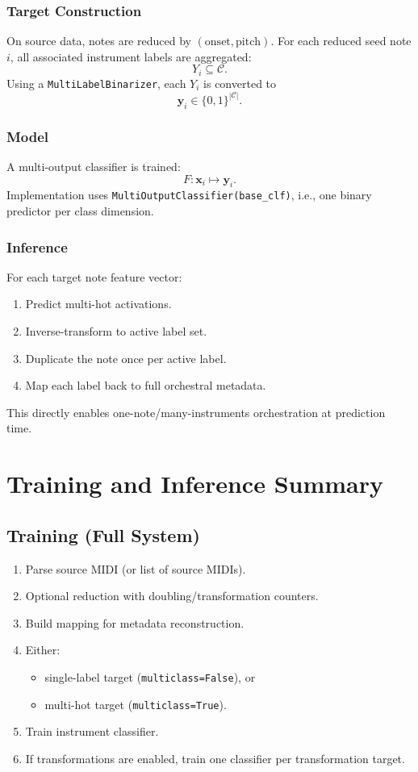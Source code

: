 \documentclass{aimc2026}
\begin{document}
\subsubsection{Target Construction}
On source data, notes are reduced by \((\mbox{onset}, \mbox{pitch})\). For each reduced seed note \(i\), all associated instrument labels are aggregated:
\[
Y_i \subseteq \mathcal{C}.
\]
Using a \texttt{MultiLabelBinarizer}, each \(Y_i\) is converted to
\[
\mathbf{y}_i \in \{0,1\}^{|\mathcal{C}|}.
\]

\subsubsection{Model}
A multi-output classifier is trained:
\[
F: \mathbf{x}_i \mapsto \mathbf{y}_i.
\]
Implementation uses \texttt{MultiOutputClassifier(base\_clf)}, i.e., one binary predictor per class dimension.

\subsubsection{Inference}
For each target note feature vector:
\begin{enumerate}
	\item Predict multi-hot activations.
	\item Inverse-transform to active label set.
	\item Duplicate the note once per active label.
	\item Map each label back to full orchestral metadata.
\end{enumerate}
This directly enables one-note/many-instruments orchestration at prediction time.

\section{Training and Inference Summary}

\subsection{Training (Full System)}
\begin{enumerate}
	\item Parse source MIDI (or list of source MIDIs).
	\item Optional reduction with doubling/transformation counters.
	\item Build mapping for metadata reconstruction.
	\item Either:
	\begin{itemize}
		\item single-label target (\texttt{multiclass=False}), or
		\item multi-hot target (\texttt{multiclass=True}).
	\end{itemize}
	\item Train instrument classifier.
	\item If transformations are enabled, train one classifier per transformation target.
\end{enumerate}
\end{document}
